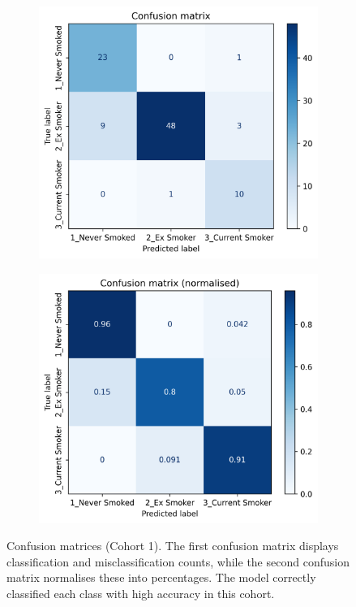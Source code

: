 \documentclass{article} %
\begin{document}
\begin{figure}[htb]
    \centering
    \begin{subfigure}{0.49\linewidth}
        \centering
        \includegraphics[width=\linewidth]{cohort1/test_confusion_matrix.png}
    \end{subfigure}
    \hfill
    \begin{subfigure}{0.49\linewidth}
        \centering
        \includegraphics[width=\linewidth]{cohort1/test_confusion_matrix_normalised.png}
    \end{subfigure}
    \caption[Confusion matrices (Cohort 1)]{Confusion matrices (Cohort 1). The first confusion matrix displays classification and misclassification counts, while the second confusion matrix normalises these into percentages. The model correctly classified each class with high accuracy in this cohort.}
    \label{fig:cohort1-confusion-matrix}
\end{figure}
\end{document}
